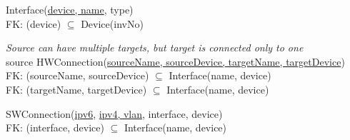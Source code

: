 \documentclass[a4paper,10pt]{article}
\begin{document}
Interface(\underline{device, name}, type)\\
\hspace*{1em}FK: (device) \(\subseteq\) Device(invNo)

\textit{Source can have multiple targets, but target is connected only to one}\\
source HWConnection(\underline{sourceName, sourceDevice, targetName, targetDevice})\\
\hspace*{1em}FK: (sourceName, sourceDevice) \(\subseteq\) Interface(name, device)\\
\hspace*{1em}FK: (targetName, targetDevice) \(\subseteq\) Interface(name, device)

SWConnection(\underline{ipv6}, \underline{ipv4, vlan}, interface, device)\\
\hspace*{1em}FK: (interface, device) \(\subseteq\) Interface(name, device)
\end{document}
